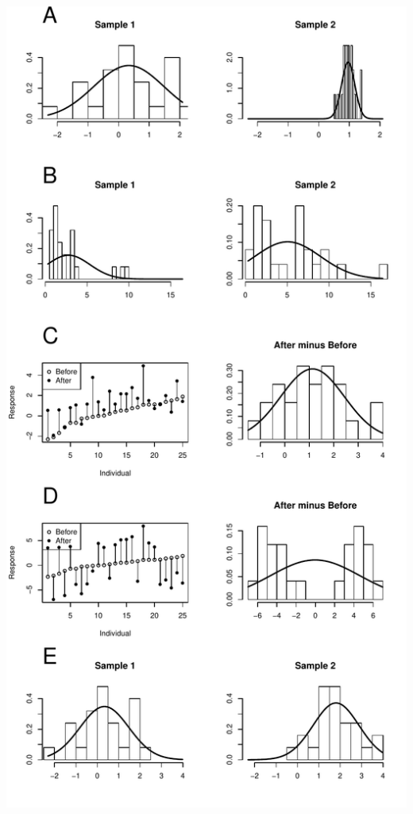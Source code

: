 \documentclass[10pt,draft]{article}
\begin{document}
\vspace{0.2in}

\begin{minipage}{0.6\linewidth}
    \includegraphics[width=\textwidth]{plots2}
\end{minipage}
\end{document}
